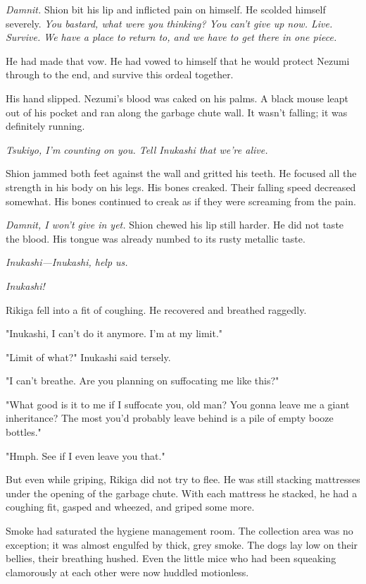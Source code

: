 \emph{Damnit.} Shion bit his lip and inflicted pain on himself. He scolded
himself severely. \emph{You bastard, what were you thinking? You can't give up
now. Live. Survive. We have a place to return to, and we have to get
there in one piece.}

He had made that vow. He had vowed to himself that he would protect
Nezumi through to the end, and survive this ordeal together.

His hand slipped. Nezumi's blood was caked on his palms. A black mouse
leapt out of his pocket and ran along the garbage chute wall. It wasn't
falling; it was definitely running.

\emph{Tsukiyo, I'm counting on you. Tell Inukashi that we're alive.}

Shion jammed both feet against the wall and gritted his teeth. He
focused all the strength in his body on his legs. His bones creaked.
Their falling speed decreased somewhat. His bones continued to creak as
if they were screaming from the pain.

\emph{Damnit, I won't give in yet.} Shion chewed his lip still harder. He did
not taste the blood. His tongue was already numbed to its rusty metallic
taste.

\emph{Inukashi---Inukashi, help us.}

\emph{Inukashi!}

\myspace

Rikiga fell into a fit of coughing. He recovered and breathed raggedly.

"Inukashi, I can't do it anymore. I'm at my limit."

"Limit of what?" Inukashi said tersely.

"I can't breathe. Are you planning on suffocating me like this?"

"What good is it to me if I suffocate you, old man? You gonna leave me a
giant inheritance? The most you'd probably leave behind is a pile of
empty booze bottles."

"Hmph. See if I even leave you that."

But even while griping, Rikiga did not try to flee. He was still
stacking mattresses under the opening of the garbage chute. With each
mattress he stacked, he had a coughing fit, gasped and wheezed, and
griped some more.

Smoke had saturated the hygiene management room. The collection area was
no exception; it was almost engulfed by thick, grey smoke. The dogs lay
low on their bellies, their breathing hushed. Even the little mice who
had been squeaking clamorously at each other were now huddled
motionless.

